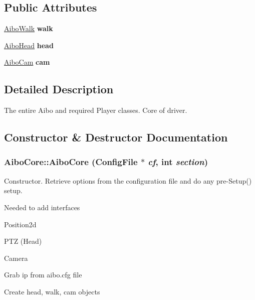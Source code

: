 \subsection*{Public Attributes}
\begin{DoxyCompactItemize}
\item 
\hypertarget{classAiboCore_a0bfbdcab738086d571c8dd9936408221}{
\hyperlink{classAiboWalk}{AiboWalk} {\bfseries walk}}
\label{classAiboCore_a0bfbdcab738086d571c8dd9936408221}

\item 
\hypertarget{classAiboCore_a82f60f050d49dc500a23beff1c80d658}{
\hyperlink{classAiboHead}{AiboHead} {\bfseries head}}
\label{classAiboCore_a82f60f050d49dc500a23beff1c80d658}

\item 
\hypertarget{classAiboCore_ac299b12604a05d4be74eafac7162ba10}{
\hyperlink{classAiboCam}{AiboCam} {\bfseries cam}}
\label{classAiboCore_ac299b12604a05d4be74eafac7162ba10}

\end{DoxyCompactItemize}


\subsection{Detailed Description}
The entire Aibo and required Player classes. Core of driver. 

\subsection{Constructor \& Destructor Documentation}
\hypertarget{classAiboCore_a377640056394d6235609688045288fe7}{
\subsubsection[{AiboCore}]{\setlength{\rightskip}{0pt plus 5cm}AiboCore::AiboCore (ConfigFile $\ast$ {\em cf}, \/  int {\em section})}}
\label{classAiboCore_a377640056394d6235609688045288fe7}
Constructor. Retrieve options from the configuration file and do any pre-\/Setup() setup. 

Needed to add interfaces

Position2d

PTZ (Head)

Camera

Grab ip from aibo.cfg file

Create head, walk, cam objects 

